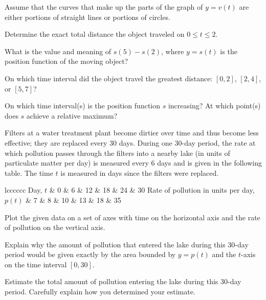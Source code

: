 Assume that the curves that make up the parts of the graph of \(y=v(t)\)
are either portions of straight lines or portions of circles.

Determine the exact total distance the object traveled on
\(0 \le t \le 2\).

What is the value and meaning of \(s(5) - s(2)\), where \(y = s(t)\) is
the position function of the moving object?

On which time interval did the object travel the greatest distance:
\([0,2]\), \([2,4]\), or \([5,7]\)?

On which time interval(s) is the position function \(s\) increasing? At
which point(s) does \(s\) achieve a relative maximum?

Filters at a water treatment plant become dirtier over time and thus
become less effective; they are replaced every 30 days. During one
30-day period, the rate at which pollution passes through the filters
into a nearby lake (in units of particulate matter per day) is measured
every 6 days and is given in the following table. The time \(t\) is
measured in days since the filters were replaced.

{\textbar{}l\textbar{}c\textbar{}c\textbar{}c\textbar{}c\textbar{}c\textbar{}c\textbar{}}
Day, \(t\) \& 0 \& 6 \& 12 \& 18 \& 24 \& 30 Rate of pollution in units
per day, \(p(t)\) \& 7 \& 8 \& 10 \& 13 \& 18 \& 35

Plot the given data on a set of axes with time on the horizontal axis
and the rate of pollution on the vertical axis.

Explain why the amount of pollution that entered the lake during this
30-day period would be given exactly by the area bounded by \(y = p(t)\)
and the \(t\)-axis on the time interval \([0,30]\).

Estimate the total amount of pollution entering the lake during this
30-day period. Carefully explain how you determined your estimate.
